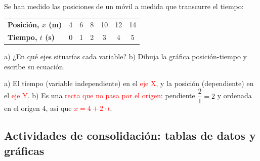 \begin{exercise}
    Se han medido las posiciones de un móvil a medida que transcurre el tiempo:
    \begin{center}
        \begin{tabular}{@{}lcccccc@{}}
            \toprule
            \textbf{Posición, \(x\) (m)} & 4 & 6 & 8 & 10 & 12 & 14 \\[3pt]
            \textbf{Tiempo, \(t\) (s)} & 0 & 1 & 2 & 3 & 4 & 5 \\
            \bottomrule
        \end{tabular}
    \end{center}
    a) ¿En qué ejes situarías cada variable? b) Dibuja la gráfica posición-tiempo y escribe su ecuación.
    \begin{solu}
        a) El tiempo (variable independiente) en el \textcolor{red}{eje X}, y la posición (dependiente) en el \textcolor{red}{eje Y}.
        b) Es una \textcolor{red}{recta que no pasa por el origen}: pendiente \(\dfrac{2}{1} = 2\) y ordenada en el origen 4, así que \textcolor{red}{\(x = 4 + 2 \cdot t\)}.
        \begin{center}
        \end{center}
    \end{solu}
\end{exercise}

\subsection*{Actividades de consolidación: tablas de datos y gráficas}

